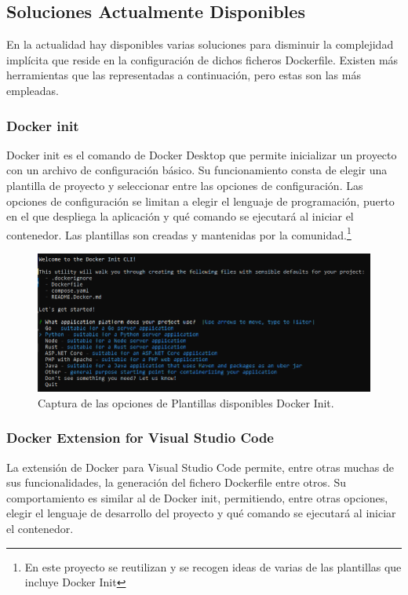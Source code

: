 \documentclass[12pt, a4paper, twoside]{article}
\begin{document}
\subsection{Soluciones Actualmente Disponibles}
En la actualidad hay disponibles varias soluciones para disminuir la complejidad implícita que reside en la configuración de dichos ficheros Dockerfile. Existen más herramientas que las representadas a continuación, pero estas son las más empleadas.
\subsubsection{Docker init}
Docker init es el comando de Docker Desktop \cite{docker_desktop} que permite inicializar un proyecto con un archivo de configuración básico.
Su funcionamiento consta de elegir una plantilla de proyecto y seleccionar entre las opciones de configuración.
Las opciones de configuración se limitan a elegir el lenguaje de programación, puerto en el que despliega la aplicación y qué comando se ejecutará al iniciar el contenedor.
Las plantillas son creadas y mantenidas por la comunidad.\footnote{En este proyecto se reutilizan y se recogen ideas de varias de las plantillas que incluye Docker Init}
\begin{figure}[ht]
  \centering
    \includegraphics[width=1\textwidth]{Docker Init.png}
  \caption{Captura de las opciones de Plantillas disponibles Docker Init.}
\end{figure}

\newpage
\subsubsection{Docker Extension for Visual Studio Code}
La extensión de Docker para Visual Studio Code \cite{vscode_containers_overview} permite, entre otras muchas de sus funcionalidades, la generación del fichero Dockerfile entre otros.
Su comportamiento es similar al de Docker init, permitiendo, entre otras opciones, elegir el lenguaje de desarrollo del proyecto y qué comando se ejecutará al iniciar el contenedor.
\end{document}
